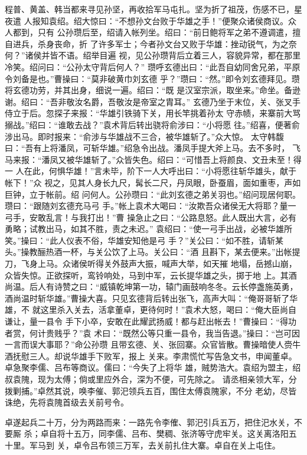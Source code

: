 程普、黄盖、韩当都来寻见孙坚，再收拾军马屯扎。坚为折了祖茂，伤感不已，星夜遣
人报知袁绍。绍大惊曰：“不想孙文台败于华雄之手！”便聚众诸侯商议。众人都到，只有
公孙瓒后至，绍请入帐列坐。绍曰：“前日鲍将军之弟不遵调遣，擅自进兵，杀身丧命，折
了许多军士；今者孙文台又败于华雄：挫动锐气，为之奈何？”诸侯并皆不语。绍举目遍
视，见公孙瓒背后立着三人，容貌异常，都在那里冷笑。绍问曰：“公孙太守背后何人？”
瓒呼玄德出曰：“此吾自幼同舍兄弟，平原令刘备是也。”曹操曰：“莫非破黄巾刘玄德
乎？”瓒曰：“然。”即令刘玄德拜见。瓒将玄德功劳，并其出身，细说一遍。绍曰：“既
是汉室宗派，取坐来。”命坐。备逊谢。绍曰：“吾非敬汝名爵，吾敬汝是帝室之胄耳。”
玄德乃坐于末位，关、张叉手侍立于后。忽探子来报：“华雄引铁骑下关，用长竿挑着孙太
守赤帻，来寨前大骂搦战。”绍曰：“谁敢去战？”袁术背后转出骁将俞涉曰：“小将愿
往。”绍喜，便著俞涉出马。即时报来：“俞涉与华雄战不三合，被华雄斩了。”众大惊。
太守韩馥曰：“吾有上将潘凤，可斩华雄。”绍急令出战。潘凤手提大斧上马。去不多时，
飞马来报：“潘凤又被华雄斩了。”众皆失色。绍曰：“可惜吾上将颜良、文丑未至！得一
人在此，何惧华雄！”言未毕，阶下一人大呼出曰：“小将愿往斩华雄头，献于帐下！”众
视之，见其人身长九尺，髯长二尺，丹凤眼，卧蚕眉，面如重枣，声如巨钟，立于帐前。绍
问何人。公孙瓒曰：“此刘玄德之弟关羽也。”绍问现居何职。瓒曰：“跟随刘玄德充马弓
手。”帐上袁术大喝曰：“汝欺吾众诸侯无大将耶？量一弓手，安敢乱言！与我打出！”曹
操急止之曰：“公路息怒。此人既出大言，必有勇略；试教出马，如其不胜，责之未迟。”
袁绍曰：“使一弓手出战，必被华雄所笑。”操曰：“此人仪表不俗，华雄安知他是弓
手？”关公曰：“如不胜，请斩某头。”操教酾热酒一杯，与关公饮了上马。关公曰：“酒
且斟下，某去便来。”出帐提刀，飞身上马。众诸侯听得关外鼓声大振，喊声大举，如天摧
地塌，岳撼山崩，众皆失惊。正欲探听，鸾铃响处，马到中军，云长提华雄之头，掷于地
上。其酒尚温。后人有诗赞之曰：“威镇乾坤第一功，辕门画鼓响冬冬。云长停盏施英勇，
酒尚温时斩华雄。”曹操大喜。只见玄德背后转出张飞，高声大叫：“俺哥哥斩了华雄，不
就这里杀入关去，活拿董卓，更待何时！”袁术大怒，喝曰：“俺大臣尚自谦让，量一县令
手下小卒，安敢在此耀武扬威！都与赶出帐去！”曹操曰：“得功者赏，何计贵贱乎？”袁
术曰：“既然公等只重一县令，我当告退。”操曰：“岂可因一言而误大事耶？”命公孙瓒
且带玄德、关、张回寨。众官皆散。曹操暗使人赍牛酒抚慰三人。却说华雄手下败军，报上
关来。李肃慌忙写告急文书，申闻董卓。卓急聚李儒、吕布等商议。儒曰：“今失了上将华
雄，贼势浩大。袁绍为盟主，绍叔袁隗，现为太傅；倘或里应外合，深为不便，可先除之。
请丞相亲领大军，分拨剿捕。”卓然其说，唤李催、郭汜领兵五百，围住太傅袁隗家，不分
老幼，尽皆诛绝，先将袁隗首级去关前号令。

卓遂起兵二十万，分为两路而来：一路先令李傕、郭汜引兵五万，把住汜水关，不要厮
杀；卓自将十五万，同李儒、吕布、樊稠、张济等守虎牢关。这关离洛阳五十里。军马到
关，卓令吕布领三万军，去关前扎住大寨。卓自在关上屯住。

